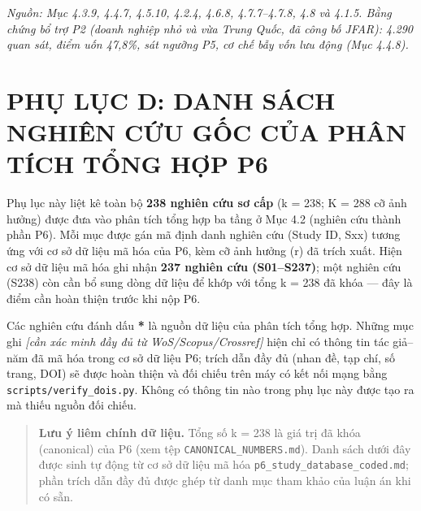 \documentclass[
  a4paper,
  13pt]{extreport}
\begin{document}
\emph{Nguồn: Mục 4.3.9, 4.4.7, 4.5.10, 4.2.4, 4.6.8, 4.7.7--4.7.8, 4.8
và 4.1.5. Bằng chứng bổ trợ P2 (doanh nghiệp nhỏ và vừa Trung Quốc, đã
công bố JFAR): 4.290 quan sát, điểm uốn 47,8\%, sát ngưỡng P5, cơ chế
bẫy vốn lưu động (Mục 4.4.8).}

\newpage

\hypertarget{phux1ee5-lux1ee5c-d-danh-suxe1ch-nghiuxean-cux1ee9u-gux1ed1c-cux1ee7a-phuxe2n-tuxedch-tux1ed5ng-hux1ee3p-p6}{%
\chapter{PHỤ LỤC D: DANH SÁCH NGHIÊN CỨU GỐC CỦA PHÂN TÍCH TỔNG HỢP
P6}\label{phux1ee5-lux1ee5c-d-danh-suxe1ch-nghiuxean-cux1ee9u-gux1ed1c-cux1ee7a-phuxe2n-tuxedch-tux1ed5ng-hux1ee3p-p6}}

Phụ lục này liệt kê toàn bộ \textbf{238 nghiên cứu sơ cấp} (k = 238; K =
288 cỡ ảnh hưởng) được đưa vào phân tích tổng hợp ba tầng ở Mục 4.2
(nghiên cứu thành phần P6). Mỗi mục được gán mã định danh nghiên cứu
(Study ID, Sxx) tương ứng với cơ sở dữ liệu mã hóa của P6, kèm cỡ ảnh
hưởng (r) đã trích xuất. Hiện cơ sở dữ liệu mã hóa ghi nhận \textbf{237
nghiên cứu (S01--S237)}; một nghiên cứu (S238) còn cần bổ sung dòng dữ
liệu để khớp với tổng k = 238 đã khóa --- đây là điểm cần hoàn thiện
trước khi nộp P6.

Các nghiên cứu đánh dấu \textbf{*} là nguồn dữ liệu của phân tích tổng
hợp. Những mục ghi \emph{{[}cần xác minh đầy đủ từ
WoS/Scopus/Crossref{]}} hiện chỉ có thông tin tác giả--năm đã mã hóa
trong cơ sở dữ liệu P6; trích dẫn đầy đủ (nhan đề, tạp chí, số trang,
DOI) sẽ được hoàn thiện và đối chiếu trên máy có kết nối mạng bằng
\texttt{scripts/verify\_dois.py}. Không có thông tin nào trong phụ lục
này được tạo ra mà thiếu nguồn đối chiếu.

\begin{quote}
\textbf{Lưu ý liêm chính dữ liệu.} Tổng số k = 238 là giá trị đã khóa
(canonical) của P6 (xem tệp \texttt{CANONICAL\_NUMBERS.md}). Danh sách
dưới đây được sinh tự động từ cơ sở dữ liệu mã hóa
\texttt{p6\_study\_database\_coded.md}; phần trích dẫn đầy đủ được ghép
từ danh mục tham khảo của luận án khi có sẵn.
\end{quote}
\end{document}
